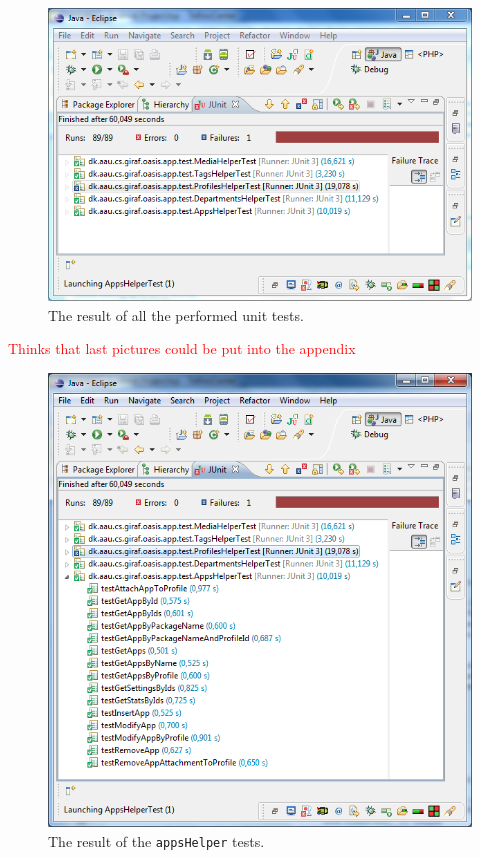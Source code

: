\begin{figure}[htbp]
	\centering
		\includegraphics[width=\textwidth]{Images/unit_testing/all_tests.PNG}
	\caption{The result of all the performed unit tests.}
	\label{fig:all_tests}
\end{figure}

\textcolor{red}{Thinks that last pictures could be put into the appendix}

\begin{figure}[htbp]
	\centering
		\includegraphics[width=\textwidth]{Images/unit_testing/app_helper_tests.PNG}
	\caption{The result of the \texttt{appsHelper} tests.}
	\label{fig:app_helper_tests}
\end{figure}

